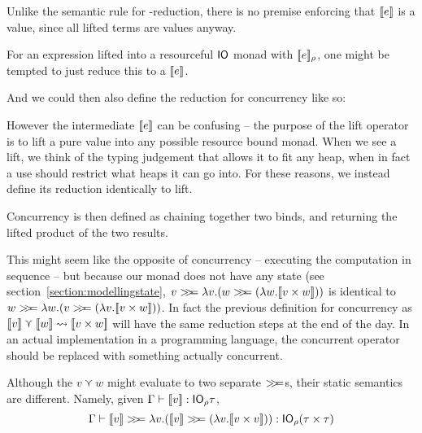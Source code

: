 Unlike the semantic rule for \beta-reduction, there is no premise
enforcing that $\lift{e}$ is a value, since all lifted terms are
values anyway.

For an expression lifted into a resourceful $\IO$ monad with
$\use{\rho}{e}$, one might be tempted to just reduce this to a $\lift{e}$.
\begin{mathpar}
\end{mathpar}

And we could then also define the reduction for concurrency like so:
\begin{mathpar}
\end{mathpar}

However the intermediate $\lift{e}$ can be confusing -- the purpose of
the lift operator is to lift a pure value into any possible resource
bound monad. When we see a lift, we think of the typing judgement that
allows it to fit any heap, when in fact a use should restrict what
heaps it can go into. For these reasons, we instead define its
reduction identically to lift.
\begin{mathpar}
\end{mathpar}

Concurrency is then defined as chaining together two binds, and
returning the lifted product of the two results.
\begin{mathpar}
\end{mathpar}

This might seem like the opposite of concurrency -- executing the
computation in sequence -- but because our monad does not have any
state (see section~\ref{section:modellingstate},
${v \bind \lambda v . (w \bind (\lambda w . \lift{v \times w}))}$ is identical to
$w \bind \lambda w . (v \bind (\lambda v . \lift{v \times w}))$. In fact the previous
definition for concurrency as
$\lift{v} \curlyvee \lift{w} \leadsto \llbracket v \times w\rrbracket$ will have the same reduction steps at
the end of the day. In an actual implementation in a programming
language, the concurrent operator should be replaced with something
actually concurrent.

Although the $v \curlyvee w$ might evaluate to two separate $\bind$s, their
static semantics are different. Namely, given
$\Gamma \vdash \lift{v} : \IO_\rho \tau$,
$$
\Gamma \vdash \lift{v} \bind \lambda v . (\lift{v} \bind (\lambda v . \lift{v \times v})) : \IO_\rho (\tau \times \tau)
$$

